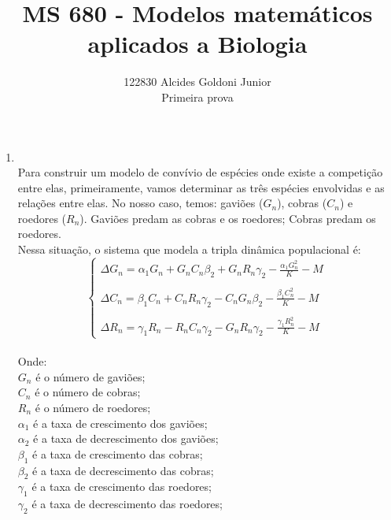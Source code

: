 \documentclass[a4paper]{article}
\title{MS 680 - Modelos matem\'{a}ticos aplicados a Biologia}
\author{122830 Alcides Goldoni Junior\\
  \small Primeira prova \\
}%
\begin{document}
\maketitle
\begin{enumerate}

\item
\\
Para construir um modelo de conv\'ivio de esp\'ecies onde existe a competi\c{c}\~ao entre elas, primeiramente, vamos determinar as tr\^es esp\'ecies envolvidas e as rela\c{c}\~oes entre elas. No nosso caso, temos: gavi\~oes ($G_n$), cobras ($C_n$) e roedores ($R_n$). Gavi\~oes predam as cobras e os roedores; Cobras predam os roedores.\\
Nessa situa\c{c}\~ao, o sistema que modela a tripla din\^amica populacional \'e:
\begin{equation}
\left\{\begin{array}{l}
\Delta G_n = \alpha_1 G_n + G_n C_n\beta_2 + G_n R_n\gamma_2 - \frac{\alpha_1 G_n ^2}{K}  - M\\
\\
\Delta C_n = \beta_1 C_n + C_n R_n\gamma_2 - C_n G_n\beta_2 - \frac{\beta_1 C_n ^2}{K} - M \\
\\
\Delta R_n = \gamma_1 R_n - R_n C_n\gamma_2 - G_n R_n\gamma_2 - \frac{\gamma_1 R_n ^2}{K} -M 
\end{array}
\end{equation}
\\
Onde:\\
$G_n$ \'e o n\'umero de gavi\~oes;\\
$C_n$ \'e o n\'umero de cobras;\\
$R_n$ \'e o n\'umero de roedores;\\
$\alpha_1$ \'e a taxa de crescimento dos gavi\~oes;\\
$\alpha_2$ \'e a taxa de decrescimento dos gavi\~oes;\\
$\beta_1$ \'e a taxa de crescimento das cobras;\\
$\beta_2$ \'e a taxa de decrescimento das cobras;\\
$\gamma_1$ \'e a taxa de crescimento das roedores;\\
$\gamma_2$ \'e a taxa de decrescimento das roedores;\\

\end{enumerate}
\end{document}
